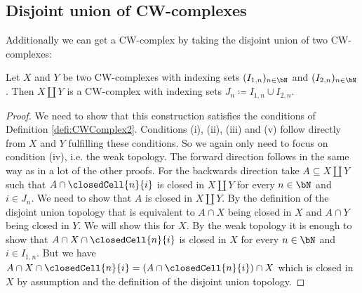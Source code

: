 \subsection{Disjoint union of CW-complexes}

Additionally we can get a CW-complex by taking the disjoint union of two CW-complexes: 

\begin{lem}
    Let $X$ and $Y$ be two CW-complexes with indexing sets $(I_{1,n})_{n \in \bN}$ and $(I_{2, n})_{n \in \bN}$. 
    Then $X \amalg Y$ is a CW-complex with indexing sets $J_n \coloneq I_{1, n} \cup I_{2, n}$.
\end{lem}
\begin{proof}
    We need to show that this construction satisfies the conditions of Definition \ref{defi:CWComplex2}. 
    Conditions (i), (ii), (iii) and (v) follow directly from $X$ and $Y$ fulfilling these conditions. 
    So we again only need to focus on condition (iv), i.e. the weak topology. 
    The forward direction follows in the same way as in a lot of the other proofs.
    For the backwards direction take $A \subseteq X \amalg Y$ such that $A \cap \closedCell{n}{i}$ is closed in $X \amalg Y$ for every $n \in \bN$ and $i \in J_n$. 
    We need to show that $A$ is closed in $X \amalg Y$. 
    By the definition of the disjoint union topology that is equivalent to $A \cap X$ being closed in $X$ and $A \cap Y$ being closed in $Y$. 
    We will show this for $X$. 
    By the weak topology it is enough to show that $A \cap X \cap \closedCell{n}{i}$ is closed in $X$ for every $n \in \bN$ and $i \in I_{1, n}$. 
    But we have $A \cap X \cap \closedCell{n}{i} = (A \cap \closedCell{n}{i}) \cap X$ which is closed in $X$ by assumption and the definition of the disjoint union topology.
\end{proof}